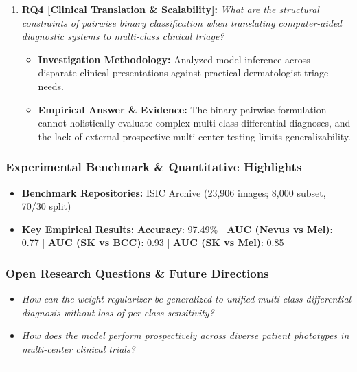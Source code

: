 \begin{enumerate}[label=\textbf{\arabic*.}, leftmargin=*]
\begin{itemize}[leftmargin=1.5em]
    \item \textbf{Investigation Methodology:} Partitioned 23,906 ISIC archive images into ~8,000 image subsets (70\% train, 30\% val) across binary clinical pairings.
    \item \textbf{Empirical Answer \& Evidence:} Achieved ROC-AUC of 0.77 for nevus vs. melanoma, 0.93 for seborrheic keratosis vs. basal cell carcinoma, 0.85 for seborrheic keratosis vs. melanoma, and 0.86 for solar lentigo vs. melanoma.
  \end{itemize}
  \item \textbf{RQ4 [Clinical Translation \& Scalability]:} \textit{What are the structural constraints of pairwise binary classification when translating computer-aided diagnostic systems to multi-class clinical triage?}
  \begin{itemize}[leftmargin=1.5em]
    \item \textbf{Investigation Methodology:} Analyzed model inference across disparate clinical presentations against practical dermatologist triage needs.
    \item \textbf{Empirical Answer \& Evidence:} The binary pairwise formulation cannot holistically evaluate complex multi-class differential diagnoses, and the lack of external prospective multi-center testing limits generalizability.
  \end{itemize}
\end{enumerate}

\subsubsection*{Experimental Benchmark \& Quantitative Highlights}
\begin{itemize}[leftmargin=*]
  \item \textbf{Benchmark Repositories:} ISIC Archive (23,906 images; 8,000 subset, 70/30 split)
  \item \textbf{Key Empirical Results:} \textbf{Accuracy}: 97.49\% \quad | \quad \textbf{AUC (Nevus vs Mel)}: 0.77 \quad | \quad \textbf{AUC (SK vs BCC)}: 0.93 \quad | \quad \textbf{AUC (SK vs Mel)}: 0.85
\end{itemize}

\subsubsection*{Open Research Questions \& Future Directions}
\begin{itemize}[leftmargin=*]
  \item \textit{How can the weight regularizer be generalized to unified multi-class differential diagnosis without loss of per-class sensitivity?}
  \item \textit{How does the model perform prospectively across diverse patient phototypes in multi-center clinical trials?}
\end{itemize}
\vspace{0.8em}\hrule\vspace{1.2em}
